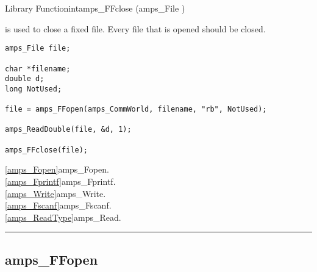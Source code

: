 \begin{deftypefn}{Library Function}{int}{amps\_FFclose}
(amps_File )

\DESCRIPTION

 is used to close a fixed file.  Every file
that is opened should be closed.

\EXAMPLE
\begin{display}\begin{verbatim}
amps_File file;

char *filename;
double d;
long NotUsed;

file = amps_FFopen(amps_CommWorld, filename, "rb", NotUsed);

amps_ReadDouble(file, &d, 1);

amps_FFclose(file);
\end{verbatim}\end{display}

\SEEALSO
\vref{amps_Fopen}{amps\_Fopen}. \\
\vref{amps_Fprintf}{amps\_Fprintf}. \\
\vref{amps_Write}{amps\_Write}. \\
\vref{amps_Fscanf}{amps\_Fscanf}. \\
\vref{amps_ReadType}{amps\_Read}. \\

\end{deftypefn}


\noindent\rule{\textwidth}{1mm}

\subsection{amps\_FFopen}
\label{amps_FFopen}


